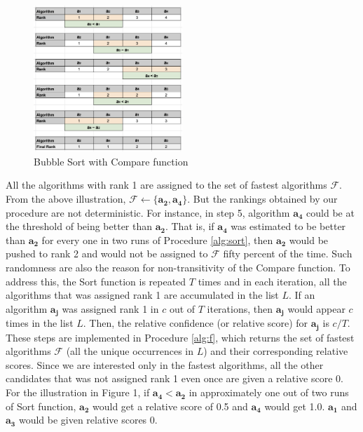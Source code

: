\documentclass[conference]{IEEEtran}
\begin{document}
\begin{figure}
	\includegraphics[width=0.5\textwidth]{fig/ranking}
	\caption{Bubble Sort with Compare function}
	\label{fig:sort}
\end{figure}

All the algorithms with rank 1 are assigned to the set of fastest algorithms $\mathcal{F}$. From the above illustration, $\mathcal{F} \leftarrow \{\mathbf{a_2}, \mathbf{a_4}\}$. But the rankings obtained by our procedure are not deterministic. For instance, in step 5, algorithm $\mathbf{a_4}$ could be at the threshold of being better than $\mathbf{a_2}$. That is, if $\mathbf{a_4}$ was estimated to be better than $\mathbf{a_2}$ for every one in two runs of Procedure \ref{alg:sort}, then $\mathbf{a_2}$ would be pushed to rank 2 and would not be assigned to $\mathcal{F}$ fifty percent of the time. Such randomness are also the reason for non-transitivity of the Compare function. To address this, the Sort function is repeated $T$ times and in each iteration, all the algorithms that was assigned rank 1 are accumulated in the list $L$. If an algorithm $\mathbf{a_j}$ was assigned rank 1 in $c$ out of $T$ iterations, then $\mathbf{a_j}$ would appear $c$ times in the list $L$. Then, the relative confidence (or relative score) for $\mathbf{a_j}$ is $c/T$. These steps are implemented in Procedure \ref{alg:f}, which returns the set of fastest algorithms $\mathcal{F}$ (all the unique occurrences in $L$) and their corresponding relative scores. Since we are interested only in the fastest algorithms, all the other candidates that was not assigned rank 1 even once are given a relative score 0. For the illustration in Figure 1, if $\mathbf{a_4} < \mathbf{a_2}$ in approximately one out of two runs of Sort function, $\mathbf{a_2}$ would get a relative score of 0.5 and $\mathbf{a_4}$ would get 1.0.  $\mathbf{a_1}$ and $\mathbf{a_3}$ would be given relative scores 0.
\end{document}
